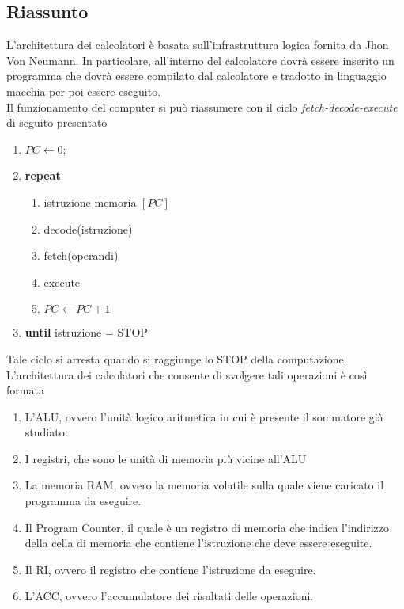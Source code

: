 \documentclass[a4paper]{extarticle}
\begin{document}
\subsection{Riassunto}
L'architettura dei calcolatori è basata sull'infrastruttura logica fornita da Jhon Von Neumann. In particolare, all'interno del calcolatore dovrà essere inserito un programma che dovrà essere compilato dal calcolatore e tradotto in linguaggio macchia per poi essere eseguito.\\
Il funzionamento del computer si può riassumere con il ciclo \textit{fetch-decode-execute} di seguito presentato
\begin{enumerate}
    \item \(PC \leftarrow 0\);
    \item \textbf{repeat}
    \begin{enumerate}
        \item istruzione \leftarrow memoria \([PC]\)
        \item decode(istruzione)
        \item fetch(operandi)
        \item execute
        \item \(PC \leftarrow PC + 1\)
    \end{enumerate}
    \item \textbf{until} istruzione  = STOP
\end{enumerate}
Tale ciclo si arresta quando si raggiunge lo STOP della computazione. L'architettura dei calcolatori che consente di svolgere tali operazioni è così formata
\begin{enumerate}
    \item L'ALU, ovvero l'unità logico aritmetica in cui è presente il sommatore già studiato.
    \item I registri, che sono le unità di memoria più vicine all'ALU
    \item La memoria RAM, ovvero la memoria volatile sulla quale viene caricato il programma da eseguire.
    \item Il Program Counter, il quale è un registro di memoria che indica l'indirizzo della cella di memoria che contiene l'istruzione che deve essere eseguite.
    \item Il RI, ovvero il registro che contiene l'istruzione da eseguire.
    \item L'ACC, ovvero l'accumulatore dei risultati delle operazioni.
\end{enumerate}

\vspace{1em}
\end{document}
